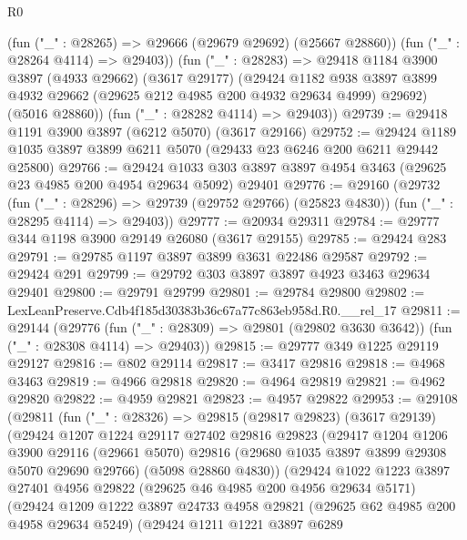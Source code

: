 \begin{lexlean}{R0}
\begin{coremodule}
        (fun ("_" : @28265) => @29666 (@29679 @29692) (@25667 @28860))
        (fun ("_" : @28264 @4114) => @29403))
      (fun ("_" : @28283) =>
      @29418
        @1184
        @3900
        @3897
        (@4933 @29662)
        (@3617 @29177)
        (@29424
          @1182
          @938
          @3897
          @3899
          @4932
          @29662
          (@29625 @212 @4985 @200 @4932 @29634 @4999)
          @29692)
        (@5016 @28860))
      (fun ("_" : @28282 @4114) => @29403))
@29739 := @29418 @1191 @3900 @3897 (@6212 @5070) (@3617 @29166)
@29752 := @29424 @1189 @1035 @3897 @3899 @6211 @5070 (@29433 @23 @6246 @200 @6211 @29442 @25800)
@29766 := @29424
    @1033
    @303
    @3897
    @3897
    @4954
    @3463
    (@29625 @23 @4985 @200 @4954 @29634 @5092)
    @29401
@29776 := @29160
    (@29732
      (fun ("_" : @28296) => @29739 (@29752 @29766) (@25823 @4830))
      (fun ("_" : @28295 @4114) => @29403))
@29777 := @20934 @29311
@29784 := @29777 @344 @1198 @3900 @29149 @26080 (@3617 @29155)
@29785 := @29424 @283
@29791 := @29785 @1197 @3897 @3899 @3631 @22486 @29587
@29792 := @29424 @291
@29799 := @29792 @303 @3897 @3897 @4923 @3463 @29634 @29401
@29800 := @29791 @29799
@29801 := @29784 @29800
@29802 := LexLeanPreserve.Cdb4f185d30383b36c67a77c863eb958d.R0.__rel_17
@29811 := @29144
    (@29776
      (fun ("_" : @28309) => @29801 (@29802 @3630 @3642))
      (fun ("_" : @28308 @4114) => @29403))
@29815 := @29777 @349 @1225 @29119 @29127
@29816 := @802 @29114
@29817 := @3417 @29816
@29818 := @4968 @3463
@29819 := @4966 @29818
@29820 := @4964 @29819
@29821 := @4962 @29820
@29822 := @4959 @29821
@29823 := @4957 @29822
@29953 := @29108
    (@29811
      (fun ("_" : @28326) =>
      @29815
        (@29817 @29823)
        (@3617 @29139)
        (@29424
          @1207
          @1224
          @29117
          @27402
          @29816
          @29823
          (@29417
            @1204
            @1206
            @3900
            @29116
            (@29661 @5070)
            @29816
            (@29680 @1035 @3897 @3899 @29308 @5070 @29690 @29766)
            (@5098 @28860 @4830))
          (@29424
            @1022
            @1223
            @3897
            @27401
            @4956
            @29822
            (@29625 @46 @4985 @200 @4956 @29634 @5171)
            (@29424
              @1209
              @1222
              @3897
              @24733
              @4958
              @29821
              (@29625 @62 @4985 @200 @4958 @29634 @5249)
              (@29424
                @1211
                @1221
                @3897
                @6289

\end{coremodule}
\end{lexlean}
